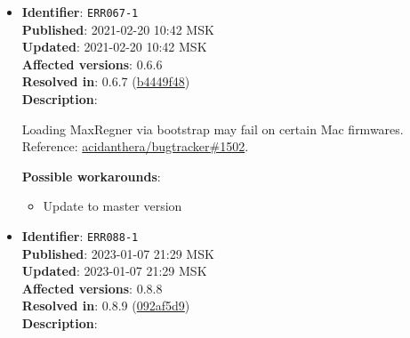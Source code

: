 \documentclass[]{article}
\providecommand{\tightlist}{%
  \setlength{\itemsep}{0pt}\setlength{\parskip}{0pt}}
\begin{document}
\begin{itemize}
  Booting Big Sur beta 10 or newer will cause a kernel panic in \texttt{apfs.kext} with the
  \texttt{Rooting from the live fs of a sealed volume is not allowed on a RELEASE build}
  message. Reference:
  \href{https://github.com/acidanthera/bugtracker/issues/1235}{acidanthera/bugtracker\#1235}.

  \textbf{Possible workarounds}:
  \begin{itemize}
    \tightlist

    \item Update to master version \texttt{OR}
    \item Set \texttt{SecureBootModel} to \texttt{Disabled}

  \end{itemize}

  \emph{Note}: On virtual machines \texttt{ForceSecureBootScheme} will also need
  to be enabled if \texttt{SecureBootModel} is different from \texttt{x86legacy}
  or \texttt{Disabled}.

\item
  \textbf{Identifier}: \texttt{ERR067-1} \\
  \textbf{Published}: 2021-02-20 10:42 MSK \\
  \textbf{Updated}: 2021-02-20 10:42 MSK \\
  \textbf{Affected versions}: 0.6.6 \\
  \textbf{Resolved in}: 0.6.7 (\href{https://github.com/acidanthera/MaxRegnerPkg/commit/b4449f48dd01703b5766352b6f29717415aff08b}{b4449f48}) \\
  \textbf{Description}:

  Loading MaxRegner via bootstrap may fail on certain Mac firmwares. Reference:
  \href{https://github.com/acidanthera/bugtracker/issues/1502}{acidanthera/bugtracker\#1502}.

  \textbf{Possible workarounds}:
  \begin{itemize}
    \tightlist

    \item Update to master version

  \end{itemize}

\item
  \textbf{Identifier}: \texttt{ERR088-1} \\
  \textbf{Published}: 2023-01-07 21:29 MSK \\
  \textbf{Updated}: 2023-01-07 21:29 MSK \\
  \textbf{Affected versions}: 0.8.8 \\
  \textbf{Resolved in}: 0.8.9 (\href{https://github.com/acidanthera/MaxRegnerPkg/commit/092af5d99c764cbe06372dfed3fa03af719550cc}{092af5d9}) \\
  \textbf{Description}:


\end{itemize}
\end{document}
